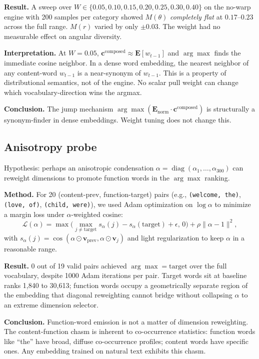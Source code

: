 \documentclass[11pt,a4paper]{article}
\begin{document}
\textbf{Result.} A sweep over $W \in \{0.05, 0.10, 0.15, 0.20, 0.25, 0.30, 0.40\}$ on the no-warp engine with 200 samples per category showed $M(\theta)$ \emph{completely flat} at $0.17$--$0.23$ across the full range. $M(r)$ varied by only $\pm 0.03$. The weight had no measurable effect on angular diversity.

\textbf{Interpretation.} At $W = 0.05$, $\mathbf{c}^{\text{composed}} \approx \mathbf{E}[w_{t-1}]$ and $\arg\max$ finds the immediate cosine neighbor. In a dense word embedding, the nearest neighbor of any content-word $w_{t-1}$ is a near-synonym of $w_{t-1}$. This is a property of distributional semantics, not of the engine. No scalar pull weight can change which vocabulary-direction wins the argmax.

\textbf{Conclusion.} The jump mechanism $\arg\max(\mathbf{E}_{\text{norm}} \cdot \mathbf{c}^{\text{composed}})$ is structurally a synonym-finder in dense embeddings. Weight tuning does not change this.

\subsection{Anisotropy probe}
Hypothesis: perhaps an anisotropic condensation $\alpha = \operatorname{diag}(\alpha_1, \ldots, \alpha_{300})$ can reweight dimensions to promote function words in the $\arg\max$ ranking.

\textbf{Method.} For 20 (content-prev, function-target) pairs (e.g., \texttt{(welcome, the)}, \texttt{(love, of)}, \texttt{(child, were)}), we used Adam optimization on $\log \alpha$ to minimize a margin loss under $\alpha$-weighted cosine:
\begin{equation}
\mathcal{L}(\alpha) = \max\!\bigl(\max_{j \neq \text{target}} s_\alpha(j) - s_\alpha(\text{target}) + \epsilon,\, 0\bigr) + \rho \lVert \alpha - 1 \rVert^2,
\end{equation}
with $s_\alpha(j) = \cos(\alpha \odot \mathbf{v}_{\text{prev}}, \alpha \odot \mathbf{v}_j)$ and light regularization to keep $\alpha$ in a reasonable range.

\textbf{Result.} 0 out of 19 valid pairs achieved $\arg\max = \text{target}$ over the full vocabulary, despite 1000 Adam iterations per pair. Target words sit at baseline ranks 1{,}840 to 30{,}613; function words occupy a geometrically separate region of the embedding that diagonal reweighting cannot bridge without collapsing $\alpha$ to an extreme dimension selector.

\textbf{Conclusion.} Function-word emission is not a matter of dimension reweighting. The content-function chasm is inherent to co-occurrence statistics: function words like ``the'' have broad, diffuse co-occurrence profiles; content words have specific ones. Any embedding trained on natural text exhibits this chasm.
\end{document}
